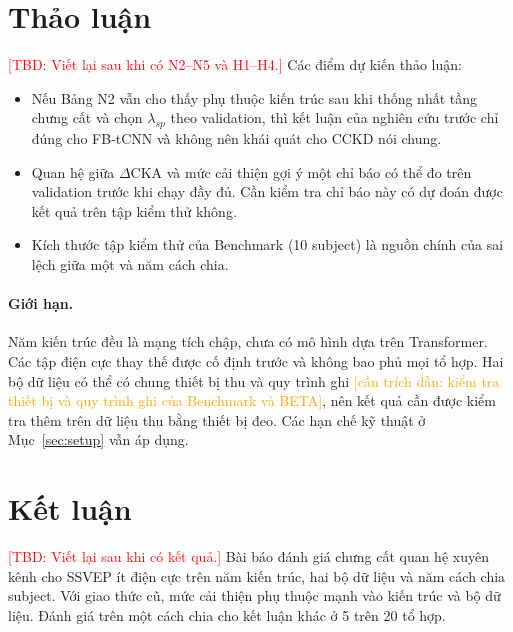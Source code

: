 \documentclass[10pt]{article} %
\newcommand{\tbd}[1]{\textcolor{red}{[TBD: #1]}}
\newcommand{\cantrich}[1]{\textcolor{orange}{[cần trích dẫn: #1]}}
\begin{document}
\section{Thảo luận}
\label{sec:discussion}

\tbd{Viết lại sau khi có N2--N5 và H1--H4.} Các điểm dự kiến thảo luận:
\begin{itemize}
    \item Nếu Bảng N2 vẫn cho thấy phụ thuộc kiến trúc sau khi thống nhất tầng chưng cất và chọn $\lambda_{sp}$ theo validation, thì kết luận của nghiên cứu trước chỉ đúng cho FB-tCNN và không nên khái quát cho CCKD nói chung.
    \item Quan hệ giữa $\Delta$CKA và mức cải thiện gợi ý một chỉ báo có thể đo trên validation trước khi chạy đầy đủ. Cần kiểm tra chỉ báo này có dự đoán được kết quả trên tập kiểm thử không.
    \item Kích thước tập kiểm thử của Benchmark (10 subject) là nguồn chính của sai lệch giữa một và năm cách chia.
\end{itemize}

\paragraph{Giới hạn.} Năm kiến trúc đều là mạng tích chập, chưa có mô hình dựa trên Transformer. Các tập điện cực thay thế được cố định trước và không bao phủ mọi tổ hợp. Hai bộ dữ liệu có thể có chung thiết bị thu và quy trình ghi \cantrich{kiểm tra thiết bị và quy trình ghi của Benchmark và BETA}, nên kết quả cần được kiểm tra thêm trên dữ liệu thu bằng thiết bị đeo. Các hạn chế kỹ thuật ở Mục~\ref{sec:setup} vẫn áp dụng.

\section{Kết luận}
\label{sec:conclusion}

\tbd{Viết lại sau khi có kết quả.} Bài báo đánh giá chưng cất quan hệ xuyên kênh cho SSVEP ít điện cực trên năm kiến trúc, hai bộ dữ liệu và năm cách chia subject. Với giao thức cũ, mức cải thiện phụ thuộc mạnh vào kiến trúc và bộ dữ liệu. Đánh giá trên một cách chia cho kết luận khác ở 5 trên 20 tổ hợp.



\end{document}
